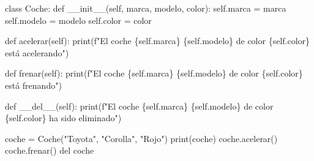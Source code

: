 \documentclass[
  a4paper,
  DIV=11,
  numbers=noendperiod,
  onepage,
  openany]{scrreprt}
\newenvironment{Shaded}{\begin{snugshade}}{\end{snugshade}}
\newcommand{\BuiltInTok}[1]{\textcolor[rgb]{0.00,0.23,0.31}{#1}}
\newcommand{\FunctionTok}[1]{\textcolor[rgb]{0.28,0.35,0.67}{#1}}
\newcommand{\KeywordTok}[1]{\textcolor[rgb]{0.00,0.23,0.31}{#1}}
\newcommand{\NormalTok}[1]{\textcolor[rgb]{0.00,0.23,0.31}{#1}}
\newcommand{\OperatorTok}[1]{\textcolor[rgb]{0.37,0.37,0.37}{#1}}
\newcommand{\SpecialCharTok}[1]{\textcolor[rgb]{0.37,0.37,0.37}{#1}}
\newcommand{\SpecialStringTok}[1]{\textcolor[rgb]{0.13,0.47,0.30}{#1}}
\newcommand{\StringTok}[1]{\textcolor[rgb]{0.13,0.47,0.30}{#1}}
\newcommand{\VariableTok}[1]{\textcolor[rgb]{0.07,0.07,0.07}{#1}}
\begin{document}
\begin{Shaded}
\begin{Highlighting}[]
\KeywordTok{class}\NormalTok{ Coche:}
    \KeywordTok{def} \FunctionTok{\_\_init\_\_}\NormalTok{(}\VariableTok{self}\NormalTok{, marca, modelo, color):}
        \VariableTok{self}\NormalTok{.marca }\OperatorTok{=}\NormalTok{ marca}
        \VariableTok{self}\NormalTok{.modelo }\OperatorTok{=}\NormalTok{ modelo}
        \VariableTok{self}\NormalTok{.color }\OperatorTok{=}\NormalTok{ color}

    \KeywordTok{def}\NormalTok{ acelerar(}\VariableTok{self}\NormalTok{):}
        \BuiltInTok{print}\NormalTok{(}\SpecialStringTok{f"El coche }\SpecialCharTok{\{}\VariableTok{self}\SpecialCharTok{.}\NormalTok{marca}\SpecialCharTok{\}}\SpecialStringTok{ }\SpecialCharTok{\{}\VariableTok{self}\SpecialCharTok{.}\NormalTok{modelo}\SpecialCharTok{\}}\SpecialStringTok{ de color }\SpecialCharTok{\{}\VariableTok{self}\SpecialCharTok{.}\NormalTok{color}\SpecialCharTok{\}}\SpecialStringTok{ está acelerando"}\NormalTok{)}

    \KeywordTok{def}\NormalTok{ frenar(}\VariableTok{self}\NormalTok{):}
        \BuiltInTok{print}\NormalTok{(}\SpecialStringTok{f"El coche }\SpecialCharTok{\{}\VariableTok{self}\SpecialCharTok{.}\NormalTok{marca}\SpecialCharTok{\}}\SpecialStringTok{ }\SpecialCharTok{\{}\VariableTok{self}\SpecialCharTok{.}\NormalTok{modelo}\SpecialCharTok{\}}\SpecialStringTok{ de color }\SpecialCharTok{\{}\VariableTok{self}\SpecialCharTok{.}\NormalTok{color}\SpecialCharTok{\}}\SpecialStringTok{ está frenando"}\NormalTok{)}

    \KeywordTok{def} \FunctionTok{\_\_del\_\_}\NormalTok{(}\VariableTok{self}\NormalTok{):}
        \BuiltInTok{print}\NormalTok{(}\SpecialStringTok{f"El coche }\SpecialCharTok{\{}\VariableTok{self}\SpecialCharTok{.}\NormalTok{marca}\SpecialCharTok{\}}\SpecialStringTok{ }\SpecialCharTok{\{}\VariableTok{self}\SpecialCharTok{.}\NormalTok{modelo}\SpecialCharTok{\}}\SpecialStringTok{ de color }\SpecialCharTok{\{}\VariableTok{self}\SpecialCharTok{.}\NormalTok{color}\SpecialCharTok{\}}\SpecialStringTok{ ha sido eliminado"}\NormalTok{)}

\NormalTok{coche }\OperatorTok{=}\NormalTok{ Coche(}\StringTok{"Toyota"}\NormalTok{, }\StringTok{"Corolla"}\NormalTok{, }\StringTok{"Rojo"}\NormalTok{)}
\BuiltInTok{print}\NormalTok{(coche)}
\NormalTok{coche.acelerar()}
\NormalTok{coche.frenar()}
\KeywordTok{del}\NormalTok{ coche}
\end{Highlighting}
\end{Shaded}
\end{document}

